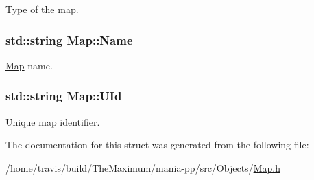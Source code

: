 Type of the map. 

\hypertarget{structMap_ab1a5bf049a4b74e704128d31e9b53b8c}{
\subsubsection[{Name}]{\setlength{\rightskip}{0pt plus 5cm}std\-::string Map\-::\-Name}}\label{structMap_ab1a5bf049a4b74e704128d31e9b53b8c}


\hyperlink{structMap}{Map} name. 

\hypertarget{structMap_aeeaed7abcf77e119d5f59c0918183834}{
\subsubsection[{U\-Id}]{\setlength{\rightskip}{0pt plus 5cm}std\-::string Map\-::\-U\-Id}}\label{structMap_aeeaed7abcf77e119d5f59c0918183834}


Unique map identifier. 



The documentation for this struct was generated from the following file\-:\begin{DoxyCompactItemize}
\item 
/home/travis/build/\-The\-Maximum/mania-\/pp/src/\-Objects/\hyperlink{Map_8h}{Map.\-h}\end{DoxyCompactItemize}
